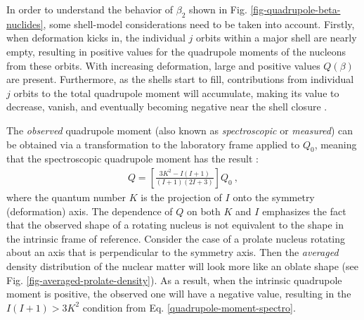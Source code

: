 In order to understand the behavior of $\beta_2$ shown in Fig. \ref{fig-quadrupole-beta-nuclides}, some shell-model considerations need to be taken into account. Firstly, when deformation kicks in, the individual $j$ orbits within a major shell are nearly empty, resulting in positive values for the quadrupole moments of the nucleons from these orbits. With increasing deformation, large and positive values $Q(\beta)$ are present. Furthermore, as the shells start to fill, contributions from individual $j$ orbits to the total quadrupole moment will accumulate, making its value to decrease, vanish, and eventually becoming negative near the shell closure \cite{casten2000nuclear}. %

The \emph{observed} quadrupole moment (also known as \emph{spectroscopic} or \emph{measured}) can be obtained via a transformation to the laboratory frame applied to $Q_0$, meaning that the spectroscopic quadrupole moment has the result \cite{casten2000nuclear}:
\begin{align}
    Q=\left[\frac{3K^2-I(I+1)}{(I+1)(2I+3)}\right]Q_0\ ,
    \label{quadrupole-moment-spectro}
\end{align}
where the quantum number $K$ is the projection of $I$ onto the symmetry (deformation) axis. The dependence of $Q$ on both $K$ and $I$ emphasizes the fact that the observed shape of a rotating nucleus is not equivalent to the shape in the intrinsic frame of reference. Consider the case of a prolate nucleus rotating about an axis that is perpendicular to the symmetry axis. Then the \emph{averaged} density distribution of the nuclear matter will look more like an oblate shape (see Fig. \ref{fig-averaged-prolate-density}). As a result, when the intrinsic quadrupole moment is positive, the observed one will have a negative value, resulting in the $I(I+1)>3K^2$ condition from Eq. \ref{quadrupole-moment-spectro}.
